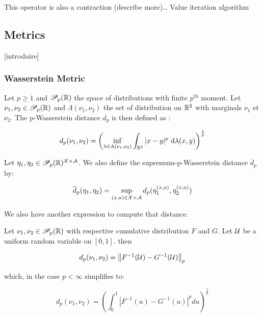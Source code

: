 This operator is also a contraction (describe more)… Value iteration algorithm














\newpage

\subsection{Metrics}

[introduire]

\subsubsection*{Wasserstein Metric}

\begin{definition}
    Let $p \geq 1$ and $\mathscr{P}_p(\mathbb{R})$ the space of distributions with finite $p^{\text{th}}$ moment. Let $\nu_1, \nu_2 \in \mathscr{P}_p(\mathbb{R})$ and $\Lambda(\nu_1, \nu_2)$ the set of distribution on $\mathbb{R}^2$ with marginals $\nu_1$ et $\nu_2$. The p-Wasserstein distance $d_p$ is then defined as :

    \[ d_p(\nu_1, \nu_2) = \left( \inf_{\lambda \in \Lambda(\nu_1, \nu_2)} \int_{\mathbb{R}^2} |x-y|^p \ \mathrm{d}\lambda(x,y) \right)^{\frac{1}{p}}\]

    Let $\eta_1, \eta_2 \in \mathscr{P}_p(\mathbb{R})^{\mathcal{X} \times \mathcal{A}}$. We also define the supremum-p-Wasserstein distance $\overline{d}_p$ by:

    \[ \overline{d}_p(\eta_1,\eta_2) = \sup_{(x,a) \in \mathcal{X} \times \mathcal{A}} d_p(\eta_1^{(x,a)}, \eta_2^{(x,a)})\]
\end{definition}

We also have another expression to compute that distance.

\begin{lemma}
    Let $\nu_1, \nu_2 \in \mathscr{P}_p(\mathbb{R})$ with respective cumulative distribution $F$ and $G$. Let $\mathcal{U}$ be a uniform random variable on $[0,1]$. then 

    \[ d_p(\nu_1, \nu_2) = \left\lVert F^{-1}(\mathcal{U}) - G^{-1}(\mathcal{U})\right\rVert_p \]

    which, in the case $p < \infty$ simplifies to:

    \[ d_p(\nu_1, \nu_2) = \left(\int_0^1\left|F^{-1}(u) - G^{-1}(u)\right|^p du\right)^{\frac{1}{p}} \]

\end{lemma}


